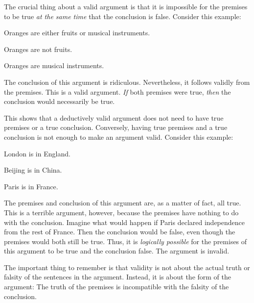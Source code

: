 The crucial thing about a valid argument is that it is impossible for the premises to be true \emph{at the same time} that the conclusion is false. Consider this example:

\begin{earg}
\item[] Oranges are either fruits or musical instruments.
\item[] Oranges are not fruits.
\item[\therefore] Oranges are musical instruments.
\end{earg}

The conclusion of this argument is ridiculous. Nevertheless, it follows validly from the premises. This is a valid argument. \emph{If} both premises were true, \emph{then} the conclusion would necessarily be true.

This shows that a deductively valid argument does not need to have true premises or a true conclusion. Conversely, having true premises and a true conclusion is not enough to make an argument valid. Consider this example:

\begin{earg}
\item[] London is in England.
\item[] Beijing is in China.
\item[\therefore] Paris is in France.
\end{earg}

The premises and conclusion of this argument are, as a matter of fact, all true. This is a terrible argument, however, because the premises have nothing to do with the conclusion. Imagine what would happen if Paris declared independence from the rest of France. Then the conclusion would be false, even though the premises would both still be true. Thus, it is \emph{logically possible} for the premises of this argument to be true and the conclusion false. The argument is invalid.

The important thing to remember is that validity is not about the actual truth or falsity of the sentences in the argument. Instead, it is about the form of the argument: The truth of the premises is incompatible with the falsity of the conclusion.




